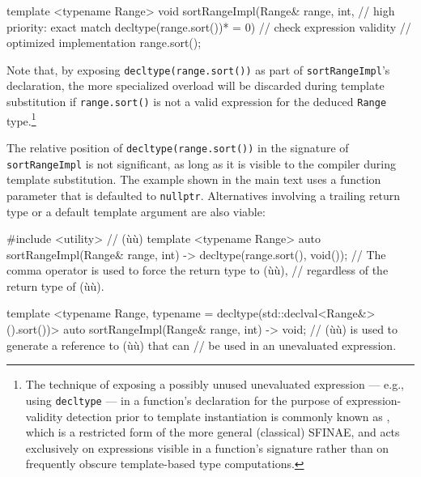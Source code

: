 \begin{emcppslisting}
template <typename Range>
void sortRangeImpl(Range& range,
                   int,                          // high priority: exact match
                   decltype(range.sort())* = 0)  // check expression validity
{
    // optimized implementation
    range.sort();
}
\end{emcppslisting}

\noindent Note that, by exposing \lstinline!decltype(range.sort())! as part of
\lstinline!sortRangeImpl!'s declaration, the more specialized overload will
be discarded during template substitution if \lstinline!range.sort()! is
not a valid expression for the deduced \lstinline!Range!
type.{\cprotect\footnote{The technique of exposing a possibly unused
unevaluated expression --- e.g., using \lstinline!decltype! --- in a function's
declaration for the purpose of expression-validity detection prior to
template instantiation is commonly known as ,
which is a restricted form of the more general (classical) SFINAE, and acts exclusively on
expressions visible in a function's signature rather than on frequently obscure
  template-based type computations.}}

The relative position of
\lstinline!decltype(range.sort())! in the signature of
\lstinline!sortRangeImpl! is not significant, as long as it is visible to
the compiler
during template substitution. The example shown in the main text uses a function parameter that is defaulted to
\lstinline!nullptr!. Alternatives involving a trailing return type or a
default template argument are also viable:

%
\begin{emcppslisting}
#include <utility>  // (ù{}ù)
template <typename Range>
auto sortRangeImpl(Range& range, int) -> decltype(range.sort(), void());
    // The comma operator is used to force the return type to (ù{}ù),
    // regardless of the return type of (ù{}ù).

template <typename Range, typename = decltype(std::declval<Range&>().sort())>
auto sortRangeImpl(Range& range, int) -> void;
    // (ù{}ù) is used to generate a reference to (ù{}ù) that can
    // be used in an unevaluated expression.
\end{emcppslisting}

